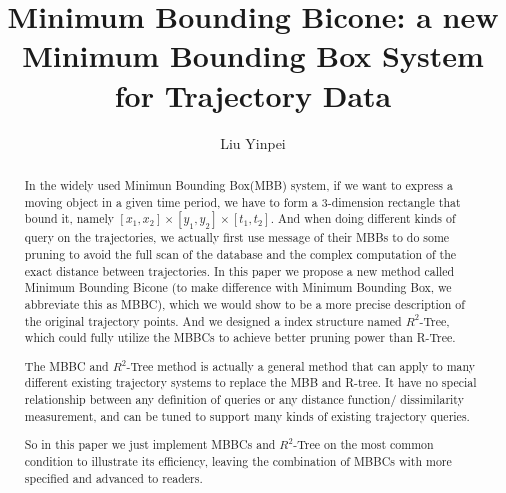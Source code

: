 \documentclass[sigplan]{acmart}
\begin{document}
\title{Minimum Bounding Bicone: a new Minimum Bounding Box System for Trajectory Data}
\author{Liu Yinpei}
\begin{abstract}
In the widely used Minimun Bounding Box(MBB) system, if we want to express a moving object in a given time period, we have to form a 3-dimension rectangle that bound it, namely $[x_1,x_2] \times [y_1,y_2] \times [t_1,t_2]$. And when doing different kinds of query on the trajectories, we actually first use message of their MBBs to do some pruning to avoid the full scan of the database and the complex computation of the exact distance between trajectories. In this paper we propose a new method called Minimum Bounding Bicone (to make difference with Minimum Bounding Box, we abbreviate this as MBBC), which we would show to be a more precise description of the original trajectory points. And we designed a index structure named $R^2$-Tree, which could fully utilize the MBBCs to achieve better pruning power than R-Tree.\par
The MBBC and $R^2$-Tree method is actually a general method that can apply to many different existing trajectory systems to replace the MBB and R-tree. It have no special relationship between any definition of queries or any distance function/ dissimilarity measurement, and can be tuned to support many kinds of existing trajectory queries.\par
So in this paper we just implement MBBCs and $R^2$-Tree on the most common condition to illustrate its efficiency, leaving the combination of MBBCs with more specified and advanced to readers.
\end{abstract}

\maketitle
\end{document}

